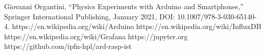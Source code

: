 \documentclass[conference]{IEEEtran}
\begin{document}
\begin{thebibliography}{00}
Giovanni Organtini, ``Physics Experiments with Arduino and Smartphones,''
Springer International Publishing, January 2021, DOI: 10.1007/978-3-030-65140-4.
 https://en.wikipedia.org/wiki/Arduino
 https://en.wikipedia.org/wiki/InfluxDB
 https://en.wikipedia.org/wiki/Grafana
 https://jupyter.org 
 https://github.com/ipfn-hpl/ard-rasp-ist
\end{thebibliography}
\end{document}
